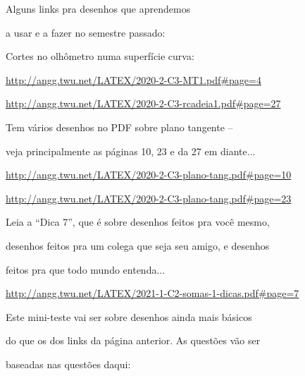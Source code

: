 \documentclass[oneside,12pt]{article}
\begin{document}
Alguns links pra desenhos que aprendemos

a usar e a fazer no semestre passado:

\msk

Cortes no olhômetro numa superfície curva:

{\footnotesize


\url{http://angg.twu.net/LATEX/2020-2-C3-MT1.pdf#page=4}

\url{http://angg.twu.net/LATEX/2020-2-C3-rcadeia1.pdf#page=27}

}

\msk

Tem vários desenhos no PDF sobre plano tangente --

veja principalmente as páginas 10, 23 e da 27 em diante...

{\footnotesize


\url{http://angg.twu.net/LATEX/2020-2-C3-plano-tang.pdf#page=10}

\url{http://angg.twu.net/LATEX/2020-2-C3-plano-tang.pdf#page=23}

}

\msk

Leia a ``Dica 7'', que é sobre desenhos feitos pra você mesmo,

desenhos feitos pra um colega que seja seu amigo, e desenhos

feitos pra que todo mundo entenda...

{\footnotesize


\url{http://angg.twu.net/LATEX/2021-1-C2-somas-1-dicas.pdf#page=7}

}




\newpage


Este mini-teste vai ser sobre desenhos ainda mais básicos

do que os dos links da página anterior. As questões vão ser

baseadas nas questões daqui:
\end{document}
